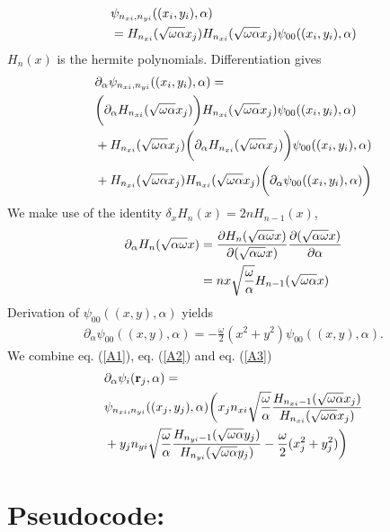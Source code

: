 \documentclass[a4paper,10pt,twocolumn]{article} %
\newcommand{\ts}[1]{\textbf{#1}}
\begin{document}
\begin{appendix}
\begin{align}
	&\psi_{n_{xi},n_{yi}}((x_i,y_i),\alpha)\notag\\
	&=H_{n_{xi}}(\sqrt{\omega\alpha}x_j)H_{n_{xi}}(\sqrt{\omega\alpha}x_j)\psi_{00}((x_i,y_i),\alpha)
\end{align}
$H_n(x)$ is the hermite polynomials.
Differentiation gives
\begin{align}
	&\partial_\alpha\psi_{n_{xi},n_{yi}}((x_i,y_i),\alpha)=\notag\\
	&\bigg(\partial_\alpha H_{n_{xi}}(\sqrt{\omega\alpha}x_j)\bigg)H_{n_{xi}}(\sqrt{\omega\alpha}x_j)\psi_{00}((x_i,y_i),\alpha)\notag\\
	&+H_{n_{xi}}(\sqrt{\omega\alpha}x_j)\bigg(\partial_\alpha H_{n_{xi}}(\sqrt{\omega\alpha}x_j)\bigg)\psi_{00}((x_i,y_i),\alpha)\notag\\
	&+H_{n_{xi}}(\sqrt{\omega\alpha}x_j)H_{n_{xi}}(\sqrt{\omega\alpha}x_j)\bigg(\partial_\alpha \psi_{00}((x_i,y_i),\alpha)\bigg)
	\label{A1}
\end{align}
We make use of the identity $\delta_x H_n(x)=2nH_{n-1}(x)$,
\begin{align}
	\partial_\alpha H_n(\sqrt{\alpha\omega}x)
	&=\frac{\partial H_n(\sqrt{\alpha\omega}x)}{\partial (\sqrt{\alpha\omega}x)} \frac{\partial (\sqrt{\alpha\omega}x)}{\partial\alpha} \notag\\
	&=nx\sqrt{\frac{\omega}{\alpha}} H_{n-1}(\sqrt{\omega\alpha}x)
	\label{A2}
\end{align}
Derivation of $\psi_{00}((x,y),\alpha)$ yields
\begin{align}
	\partial_\alpha \psi_{00}((x,y),\alpha)=
	-\frac\omega2 (x^2+y^2)	
	\psi_{00}((x,y),\alpha).
	\label{A3}
\end{align}
We combine eq. (\ref{A1}), eq. (\ref{A2}) and eq. (\ref{A3})
\begin{align}
	&\partial_\alpha \psi_i(\ts r_j,\alpha)=\notag\\
	&\psi_{n_{xi},n_{yi}}((x_j,y_j),\alpha)
	\bigg(
	 	x_j n_{xi} \sqrt{\frac\omega\alpha} \frac{H_{n_{xi}-1}(\sqrt{\omega\alpha}x_j)}{H_{n_{xi}}(\sqrt{\omega\alpha}x_j)}\notag\\
	 	&+y_j n_{yi} \sqrt{\frac\omega\alpha} \frac{H_{n_{yi}-1}(\sqrt{\omega\alpha}y_j)}{H_{n_{yi}}(\sqrt{\omega\alpha}y_j)}
		-\frac{\omega}2(x_j^2+y_j^2)
	\bigg)
\end{align}


\section{Pseudocode:}%
\end{appendix}
\end{document}
